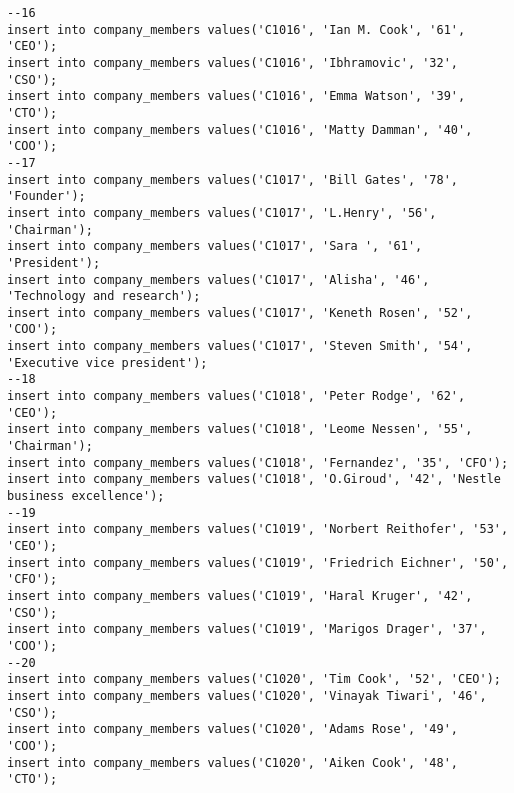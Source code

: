 \documentclass[a4,12pt]{report}
\begin{document}
\begin{lstlisting}
--16
insert into company_members values('C1016', 'Ian M. Cook', '61', 'CEO');
insert into company_members values('C1016', 'Ibhramovic', '32', 'CSO');
insert into company_members values('C1016', 'Emma Watson', '39', 'CTO');
insert into company_members values('C1016', 'Matty Damman', '40', 'COO');
--17
insert into company_members values('C1017', 'Bill Gates', '78', 'Founder');
insert into company_members values('C1017', 'L.Henry', '56', 'Chairman');
insert into company_members values('C1017', 'Sara ', '61', 'President');
insert into company_members values('C1017', 'Alisha', '46', 'Technology and research');
insert into company_members values('C1017', 'Keneth Rosen', '52', 'COO');
insert into company_members values('C1017', 'Steven Smith', '54', 'Executive vice president');
--18
insert into company_members values('C1018', 'Peter Rodge', '62', 'CEO');
insert into company_members values('C1018', 'Leome Nessen', '55', 'Chairman');
insert into company_members values('C1018', 'Fernandez', '35', 'CFO');
insert into company_members values('C1018', 'O.Giroud', '42', 'Nestle business excellence');
--19
insert into company_members values('C1019', 'Norbert Reithofer', '53', 'CEO');
insert into company_members values('C1019', 'Friedrich Eichner', '50', 'CFO');
insert into company_members values('C1019', 'Haral Kruger', '42', 'CSO');
insert into company_members values('C1019', 'Marigos Drager', '37', 'COO');
--20
insert into company_members values('C1020', 'Tim Cook', '52', 'CEO');
insert into company_members values('C1020', 'Vinayak Tiwari', '46', 'CSO');
insert into company_members values('C1020', 'Adams Rose', '49', 'COO');
insert into company_members values('C1020', 'Aiken Cook', '48', 'CTO');


\end{lstlisting}
\end{document}
